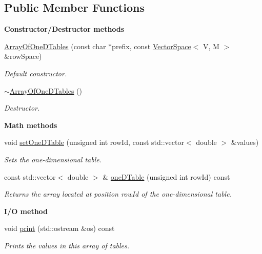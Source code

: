\subsection*{Public Member Functions}
\begin{Indent}{\bf Constructor/\-Destructor methods}\par
\begin{DoxyCompactItemize}
\item 
\hyperlink{class_q_u_e_s_o_1_1_array_of_one_d_tables_ae36f0c33595a2d46d08eced253d1eef3}{Array\-Of\-One\-D\-Tables} (const char $\ast$prefix, const \hyperlink{class_q_u_e_s_o_1_1_vector_space}{Vector\-Space}$<$ V, M $>$ \&row\-Space)
\begin{DoxyCompactList}\small\item\em Default constructor. \end{DoxyCompactList}\item 
\hyperlink{class_q_u_e_s_o_1_1_array_of_one_d_tables_a233bf24beaf3adabca4735eb7a88c966}{$\sim$\-Array\-Of\-One\-D\-Tables} ()
\begin{DoxyCompactList}\small\item\em Destructor. \end{DoxyCompactList}\end{DoxyCompactItemize}
\end{Indent}
\begin{Indent}{\bf Math methods}\par
\begin{DoxyCompactItemize}
\item 
void \hyperlink{class_q_u_e_s_o_1_1_array_of_one_d_tables_ad52be35568cf8c325569b4ae272acab9}{set\-One\-D\-Table} (unsigned int row\-Id, const std\-::vector$<$ double $>$ \&values)
\begin{DoxyCompactList}\small\item\em Sets the one-\/dimensional table. \end{DoxyCompactList}\item 
const std\-::vector$<$ double $>$ \& \hyperlink{class_q_u_e_s_o_1_1_array_of_one_d_tables_ade48785a66524243c5a22ec39bc6de2d}{one\-D\-Table} (unsigned int row\-Id) const 
\begin{DoxyCompactList}\small\item\em Returns the array located at position {\ttfamily row\-Id} of the one-\/dimensional table. \end{DoxyCompactList}\end{DoxyCompactItemize}
\end{Indent}
\begin{Indent}{\bf I/\-O method}\par
\begin{DoxyCompactItemize}
\item 
void \hyperlink{class_q_u_e_s_o_1_1_array_of_one_d_tables_aec66e8a1e7f0baf3adc29332590ea1af}{print} (std\-::ostream \&os) const 
\begin{DoxyCompactList}\small\item\em Prints the values in this array of tables. \end{DoxyCompactList}\end{DoxyCompactItemize}
\end{Indent}

